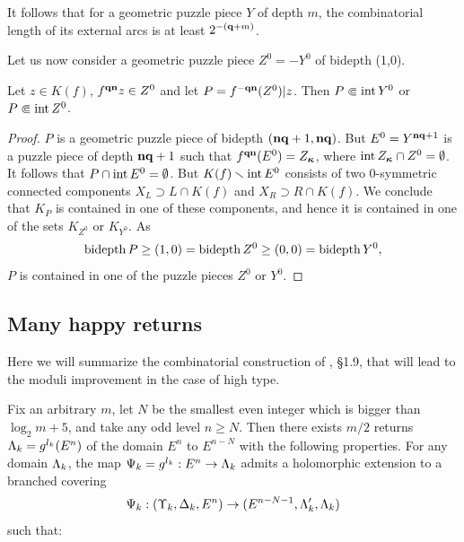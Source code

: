 It follows that
for a geometric puzzle piece $Y$ of depth $m$,
the combinatorial length of its external arcs is at least $2^{-({\mathbf{q}}+m)}$.


\msk
Let us now consider a geometric puzzle piece  $Z^0=  - Y^0$ of bidepth (1,0).

\begin{lem}\label{qn-pullbacks}
  Let $z\in K(f)$,  $f^{{\mathbf{q}}{\mathbf{n}}} z \in Z^0$ and let $P = f^{-{\mathbf{q}}{\mathbf{n}}}(Z^0)|z$.
Then $P\Subset \operatorname{int} Y^0$ or  $P\Subset \operatorname{int} Z^0$.
\end{lem}

\begin{proof}
  $P$ is a geometric puzzle piece of bidepth $({\mathbf{n}}{\mathbf{q}}+1, {\mathbf{n}}{\mathbf{q}}) $. But $E^0=Y^{{\mathbf{n}}{\mathbf{q}}+1}$ is a puzzle piece of
depth ${\mathbf{n}}{\mathbf{q}}+1$ such that $f^{{\mathbf{q}}{\mathbf{n}}}(E^0)=Z_{\boldsymbol{\kappa}}$, where $\operatorname{int} Z_{\boldsymbol{\kappa}} \cap Z^0=\emptyset$.
It follows that $P \cap \operatorname{int} E^0=\emptyset$. But $K(f)\smallsetminus \operatorname{int} E^0$ consists of two $0$-symmetric
connected components $X_L\supset L\cap K(f)$ and $X_R\supset R\cap K(f)$.
We conclude that  $K_P$ is contained in one of these components, and hence it is contained in one of the
sets $K_{Z^0}$ or $K_{Y^0}$. As
 $$
    \operatorname{bidepth} P\geq (1,0)=\operatorname{bidepth} Z^0\geq (0,0)=\operatorname{bidepth} Y^0,
$$
 $P$ is contained in one of the
puzzle pieces $Z^0$ or $Y^0$.
\end{proof}



\subsection{Many happy returns}\label{high type}
  Here we will summarize the combinatorial construction of \cite{KL-high}, \S 1.9,
that will lead to the moduli improvement in the case of high type.

Fix an arbitrary $m$, let $N$ be the smallest even integer which is bigger than $\log_2 m + 5$,
and take any odd level $n\geq N$.
Then there exists $m/2$ returns ${\Lambda}_k=g^{l_k}(E^n)$  of the domain $ E^n $ to $E^{n-N}$
with the following properties.
For any domain ${\Lambda}_k$,
the map $\Psi_k= g^{l_k}: E^n \rightarrow {\Lambda}_k$ admits a holomorphic extension to a branched covering
\begin{equation}\label{3 domains}
    \Psi_k : (\Upsilon_k , {\Delta}_k, E^n) \rightarrow (E^{n-N-1}, {\Lambda}_k', {\Lambda}_k)
\end{equation}
such that:

